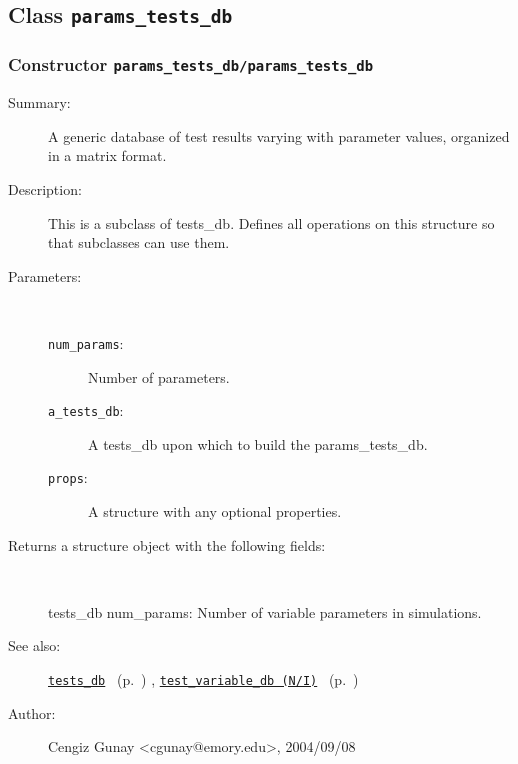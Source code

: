 \subsection{Class \texttt{params\_tests\_db}}%
%
\label{ref_params_tests_db}%
\hypertarget{ref_params_tests_db}{}%
\subsubsection[Constructor \texttt{params\_tests\_db}]{Constructor \texttt{params\_tests\_db/params\_tests\_db}}%
%
\label{ref_params_tests_db__params_tests_db}%
\hypertarget{ref_params_tests_db__params_tests_db}{}%
\begin{description}
\item[Summary:]A generic database of test results varying with 
		parameter values, organized in a matrix format.
%
%
\item[Description:]%
This is a subclass of tests\_db. Defines all operations on this
 structure so that subclasses can use them.
\item[Parameters:]~
\begin{description}%
\item[\texttt{num\_params}:]
 Number of parameters.
\item[\texttt{a\_tests\_db}:]
 A tests\_db upon which to build the params\_tests\_db.
\item[\texttt{props}:]
 A structure with any optional properties.
\end{description}%
%
\item[Returns a structure object with the following fields:]~

	tests\_db
	num\_params: Number of variable parameters in simulations.
%
%
\item[See also:]%
\hyperlink{ref_tests_db}{\texttt{tests\_db}}%
\ (p.~\pageref{ref_tests_db})%
%
, \hyperlink{ref_test_variable_db (N__I)}{\texttt{test\_variable\_db (N/I)}}%
\ (p.~\pageref{ref_test_variable_db (N__I)})%
%
%
\item[Author:]%
Cengiz Gunay <cgunay@emory.edu>, 2004/09/08%
\end{description}
\methodline%
